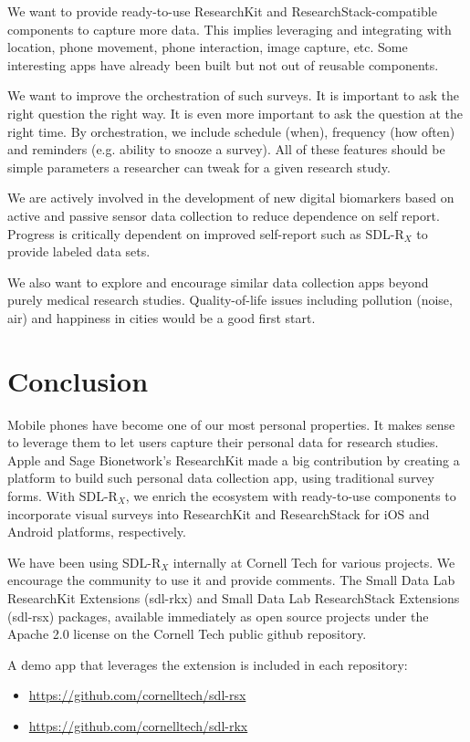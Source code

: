 \documentclass{acm_proc_article-sp}
\newcommand{\sdlrx}{SDL-R$_X$}
\begin{document}
We want to provide ready-to-use ResearchKit and ResearchStack-compatible components to capture more data. This implies leveraging and integrating with location, phone movement, phone interaction, image capture, etc. Some interesting apps have already been built but not out of reusable components.

We want to improve the orchestration of such surveys. It is important to ask the right question the right way. It is even more important to ask the question at the right time. By orchestration, we include schedule (when), frequency (how often) and reminders (e.g. ability to snooze a survey). All of these features should be simple parameters a researcher can tweak for a given research study.

We are actively involved in the development of new digital biomarkers based on active and passive  sensor data collection to reduce dependence on self report. Progress is critically dependent on improved self-report such as \sdlrx{} to provide labeled data sets.

We also want to explore and encourage similar data collection apps beyond purely medical research studies. Quality-of-life issues including pollution (noise, air) and happiness in cities would be a good first start.

\section{Conclusion}
Mobile phones have become one of our most personal properties. It makes sense to leverage them to let users capture their personal data for research studies. Apple and Sage Bionetwork's ResearchKit made a big contribution by creating a platform to build such personal data collection app, using traditional survey forms. With \sdlrx{}, we enrich the ecosystem with ready-to-use components to incorporate visual surveys into ResearchKit and ResearchStack for iOS and Android platforms, respectively.

We have been using \sdlrx{} internally at Cornell Tech for various projects. We encourage the community to use it and provide comments. The Small Data Lab ResearchKit Extensions (sdl-rkx) and Small Data Lab ResearchStack Extensions (sdl-rsx) packages, available immediately as open source projects under the Apache 2.0 license on the Cornell Tech public github repository.

A demo app that leverages the extension is included in each repository:
\begin{itemize}[noitemsep, topsep=-5pt]
\item \href{https://github.com/cornelltech/sdl-rsx}{https://github.com/cornelltech/sdl-rsx}
\item \href{https://github.com/cornelltech/sdl-rkx}{https://github.com/cornelltech/sdl-rkx}
\end{itemize}


\vspace{2.5mm}

\end{document}
